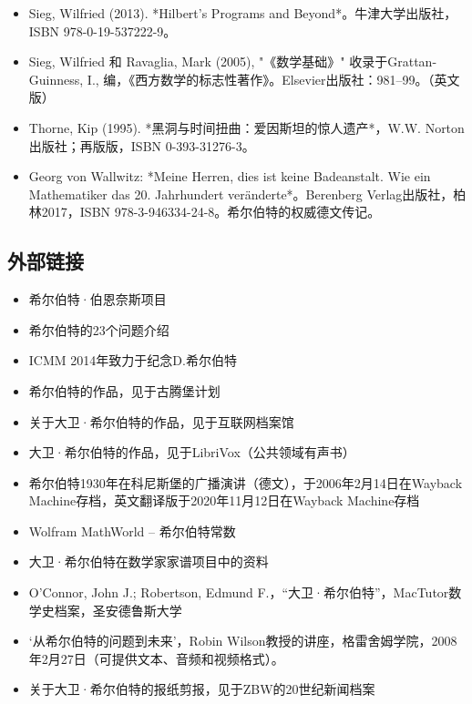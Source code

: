 \begin{itemize}
\item Sieg, Wilfried (2013). *Hilbert's Programs and Beyond*。牛津大学出版社，ISBN 978-0-19-537222-9。
\item Sieg, Wilfried 和 Ravaglia, Mark (2005), "《数学基础》" 收录于Grattan-Guinness, I., 编，《西方数学的标志性著作》。Elsevier出版社：981–99。（英文版）
\item Thorne, Kip (1995). *黑洞与时间扭曲：爱因斯坦的惊人遗产*，W.W. Norton出版社；再版版，ISBN 0-393-31276-3。
\item Georg von Wallwitz: *Meine Herren, dies ist keine Badeanstalt. Wie ein Mathematiker das 20. Jahrhundert veränderte*。Berenberg Verlag出版社，柏林2017，ISBN 978-3-946334-24-8。希尔伯特的权威德文传记。
\end{itemize}
\subsection{外部链接}
\begin{itemize}
\item 希尔伯特·伯恩奈斯项目  
\item 希尔伯特的23个问题介绍  
\item ICMM 2014年致力于纪念D.希尔伯特  
\item 希尔伯特的作品，见于古腾堡计划  
\item 关于大卫·希尔伯特的作品，见于互联网档案馆  
\item 大卫·希尔伯特的作品，见于LibriVox（公共领域有声书）  
\item 希尔伯特1930年在科尼斯堡的广播演讲（德文），于2006年2月14日在Wayback Machine存档，英文翻译版于2020年11月12日在Wayback Machine存档  
\item Wolfram MathWorld – 希尔伯特常数  
\item 大卫·希尔伯特在数学家家谱项目中的资料  
\item O'Connor, John J.; Robertson, Edmund F.，“大卫·希尔伯特”，MacTutor数学史档案，圣安德鲁斯大学  
\item ‘从希尔伯特的问题到未来’，Robin Wilson教授的讲座，格雷舍姆学院，2008年2月27日（可提供文本、音频和视频格式）。  
\item 关于大卫·希尔伯特的报纸剪报，见于ZBW的20世纪新闻档案
\end{itemize}
